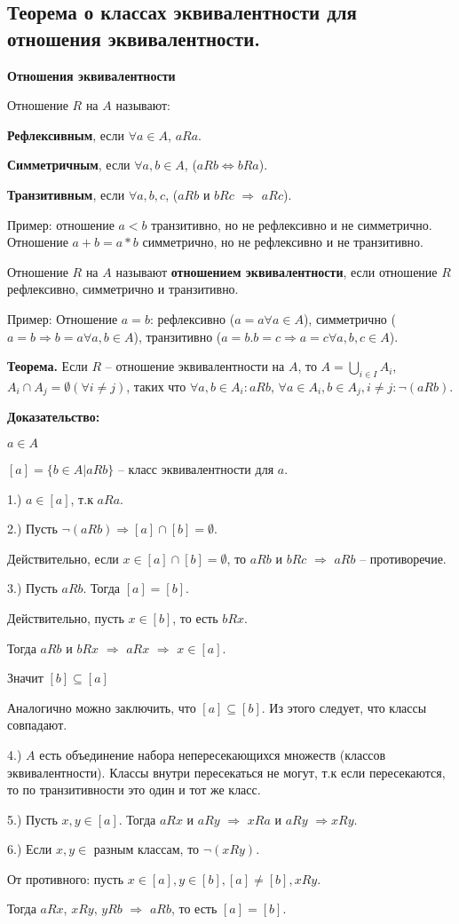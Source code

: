\subsection{Теорема о классах эквивалентности для отношения эквивалентности.}

\textbf{Отношения эквивалентности}

Отношение $R$ на $A$ называют:

\textbf{Рефлексивным}, если $\forall a \in A$, $aRa$.

\textbf{Симметричным}, если $\forall a, b \in A$, ($aRb \Leftrightarrow bRa$).

\textbf{Транзитивным}, если $\forall a, b, c$, ($aRb$ и $bRc$ $\Rightarrow$ $aRc$).

Пример: отношение $a < b$ транзитивно, но не рефлексивно и не симметрично. Отношение $a + b = a * b$ симметрично, но не рефлексивно и не транзитивно.

Отношение $R$ на $A$ называют \textbf{отношением эквивалентности}, если отношение $R$ рефлексивно, симметрично и транзитивно.

Пример: Отношение $a = b$: рефлексивно ($a = a \forall a \in A$), симметрично ($a = b \Rightarrow b = a \forall a, b \in A$), транзитивно ($a = b. b = c \Rightarrow a = c \forall a, b, c \in A$).

\textbf{Теорема.} Если $R$ -- отношение эквивалентности на $A$, то $A = \bigcup_{i \in I}A_i$, $A_i \cap A_j = \emptyset (\forall i \neq j)$, таких что $\forall a, b \in A_i : aRb$, $\forall a \in A_i, b \in A_j, i \neq j : \neg (aRb)$.

\textbf{Доказательство:}

$a \in A$

$[a] = \{b \in A | aRb\}$ -- класс эквивалентности для $a$.

1.) $a \in [a]$, т.к $aRa$.

2.) Пусть $\neg (aRb) \Rightarrow [a] \cap [b] = \emptyset$.

Действительно, если $x \in [a] \cap [b] = \emptyset$, то $aRb$ и  $bRc$
$\Rightarrow$ $aRb$ -- противоречие.

3.) Пусть $aRb$. Тогда $[a] = [b]$.

Действительно, пусть $x \in [b]$, то есть $bRx$.

Тогда $aRb$ и $bRx$ $\Rightarrow$ $aRx$ $\Rightarrow$ $x \in [a]$.

Значит $[b] \subseteq [a]$

Аналогично можно заключить, что $[a] \subseteq [b]$. Из этого следует, что классы совпадают.

4.) $A$ есть объединение набора непересекающихся множеств (классов эквивалентности). Классы внутри пересекаться не могут, т.к если пересекаются, то по транзитивности это один и тот же класс.

5.) Пусть $x, y \in [a]$. Тогда $aRx$ и $aRy$ $\Rightarrow$ $xRa$ и $aRy$ $\Rightarrow xRy$.

6.) Если $x, y \in$ разным классам, то $\neg(xRy)$.

От противного: пусть $x \in [a], y \in [b], [a] \neq [b], xRy$.

Тогда $aRx$, $xRy$, $yRb$ $\Rightarrow$ $aRb$, то есть $[a] = [b]$.